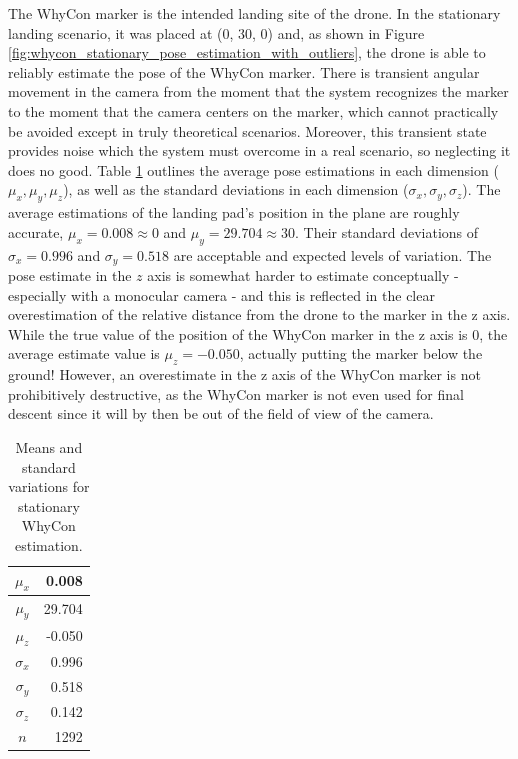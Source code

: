The WhyCon marker is the intended landing site of the drone. In the stationary landing scenario, it was placed at (0, 30, 0) and, as shown in Figure \ref{fig:whycon_stationary_pose_estimation_with_outliers}, the drone is able to reliably estimate the pose of the WhyCon marker. There is transient angular movement in the camera from the moment that the system recognizes the marker to the moment that the camera centers on the marker, which cannot practically be avoided except in truly theoretical scenarios. Moreover, this transient state provides noise which the system must overcome in a real scenario, so neglecting it does no good. Table \ref{tab:stationary_whycon_pose_estimation} outlines the average pose estimations in each dimension ($\mu_x, \mu_y, \mu_z$), as well as the standard deviations in each dimension ($\sigma_x, \sigma_y, \sigma_z$). The average estimations of the landing pad's position in the plane are roughly accurate, $\mu_x = 0.008 \approx 0$ and $\mu_y = 29.704 \approx 30$. Their standard deviations of $\sigma_x=0.996$ and $\sigma_y=0.518$ are acceptable and expected levels of variation. The pose estimate in the $z$ axis is somewhat harder to estimate conceptually - especially with a monocular camera - and this is reflected in the clear overestimation of the relative distance from the drone to the marker in the z axis. While the true value of the position of the WhyCon marker in the z axis is 0, the average estimate value is $\mu_z=-0.050$, actually putting the marker below the ground! However, an overestimate in the z axis of the WhyCon marker is not prohibitively destructive, as the WhyCon marker is not even used for final descent since it will by then be out of the field of view of the camera.

\begin{table}[ht]
    \centering
    \begin{tabular}{|c|r|}
    \hline
        $\mu_x$ &  0.008\\\hline
        $\mu_y$ &  29.704\\\hline
        $\mu_z$ &  -0.050\\\hline
        $\sigma_x$ &  0.996\\\hline
        $\sigma_y$ &  0.518\\\hline
        $\sigma_z$ &  0.142\\\hline
        $n$ & 1292\\\hline
    \end{tabular}
    \caption{Means and standard variations for stationary WhyCon estimation.}
    \label{tab:stationary_whycon_pose_estimation}
\end{table}

